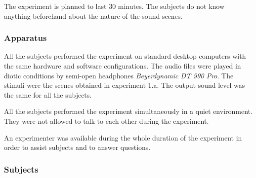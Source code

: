 \documentclass[12pt]{elsarticle}
\begin{document}

The experiment is planned to last 30 minutes. The subjects do not know anything beforehand about the nature of the sound scenes.

\subsubsection*{Apparatus}


All the subjects performed the experiment on standard desktop computers with the same hardware and software configurations. The audio files were played in diotic conditions by semi-open headphones \emph{Beyerdynamic DT 990 Pro}. The stimuli were the scenes obtained in experiment 1.a. The output sound level was the same for all the subjects.


All the subjects performed the experiment simultaneously in a quiet environment. They were not allowed to talk to each other during the experiment.


An experimenter was available during the whole duration of the experiment in order to assist subjects and to answer questions.


\subsubsection*{Subjects}

\end{document}
